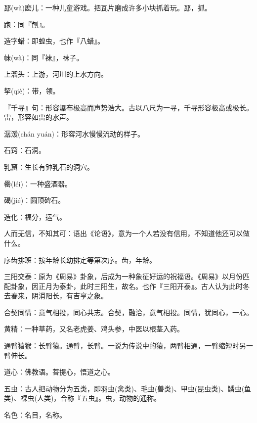 \startbuffer[17]
邷(wǎ)麽儿：一种儿童游戏。把瓦片磨成许多小块抓着玩。邷，抓。
\stopbuffer


\startbuffer[18]
跑：同『刨』。
\stopbuffer


\startbuffer[19]
造字蜡：即蝗虫，也作『八蜡』。
\stopbuffer


\startbuffer[20]
帓(wà)：同『袜』，袜子。
\stopbuffer


\startbuffer[21]
上溜头：上游，河川的上水方向。
\stopbuffer


\startbuffer[22]
挈(qiè)：带，领。
\stopbuffer


\startbuffer[23]
『千寻』句：形容瀑布极高而声势浩大。古以八尺为一寻，千寻形容极高或极长。雷，形容如雷的水声。
\stopbuffer


\startbuffer[24]
潺湲(chán yuán)：形容河水慢慢流动的样子。
\stopbuffer


\startbuffer[25]
石窍：石洞。
\stopbuffer


\startbuffer[26]
乳窟：生长有钟乳石的洞穴。
\stopbuffer


\startbuffer[27]
罍(léi)：一种盛酒器。
\stopbuffer


\startbuffer[28]
碣(jié)：圆顶碑石。
\stopbuffer


\startbuffer[29]
造化：福分，运气。
\stopbuffer


\startbuffer[30]
人而无信，不知其可：语出《论语》，意为一个人若没有信用，不知道他还可以做什么。
\stopbuffer


\startbuffer[31]
序齿排班：按年龄长幼排定等第次序。齿，年龄。
\stopbuffer


\startbuffer[32]
三阳交泰：原为《周易》卦象，后成为一种象征好运的祝福语。《周易》以月份匹配卦象，因正月为泰卦，此时三阳生，故名。也作『三阳开泰』。古人认为此时冬去春来，阴消阳长，有吉亨之象。
\stopbuffer


\startbuffer[33]
合契同情：意气相投，同心共志。合契，融洽，意气相投。同情，犹同心，一心。
\stopbuffer


\startbuffer[34]
黄精：一种草药，又名老虎姜、鸡头参，中医以根茎入药。
\stopbuffer


\startbuffer[35]
通臂猿猴：长臂猿。通臂，长臂。一说为传说中的猿，两臂相通，一臂缩短时另一臂伸长。
\stopbuffer


\startbuffer[36]
道心：佛教语。菩提心，悟道之心。
\stopbuffer


\startbuffer[37]
五虫：古人把动物分为五类，即羽虫(禽类)、毛虫(兽类)、甲虫(昆虫类)、鳞虫(鱼类)、裸虫(人类)，合称『五虫』。虫，动物的通称。
\stopbuffer


\startbuffer[38]
名色：名目，名称。
\stopbuffer


